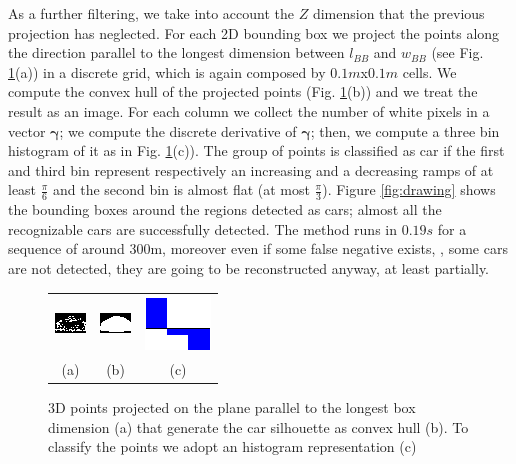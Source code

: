 As a further filtering, we take into account the $Z$ dimension that the previous projection has neglected.
For each 2D bounding box we project the points along the direction parallel to the longest dimension between $l_{BB}$ and $w_{BB}$ (see Fig. \ref{fig:convHull}(a)) in a discrete grid, which is again composed by $0.1m$x$0.1m$ cells.
We compute the convex hull of the projected points (Fig. \ref{fig:convHull}(b)) and we treat the result as an image. 
For each column we collect the number of white pixels in a vector $\mathbf{\gamma}$; we compute the discrete derivative of $\mathbf{\gamma}$; then, we compute a three bin histogram of it as in Fig. \ref{fig:convHull}(c)).
The group of points is classified as car if the first and third bin represent respectively an increasing and a decreasing ramps of at least $\frac{\pi}{6}$ and the second bin is almost flat (at most $\frac{\pi}{3}$). 
Figure \ref{fig:drawing} shows the bounding boxes around the regions detected as cars; almost all the recognizable cars are successfully detected.
The method runs in $0.19s$ for a sequence of around $300$m, moreover even if some false negative exists, \ie, some cars are not detected, they are going to be reconstructed anyway, at least partially.


\begin{figure}[tp]
    \centering
\setlength{\tabcolsep}{1px}
    \begin{tabular}{ccc}
        \includegraphics[width=0.3\columnwidth]{./img/ch-laser/CurProj.png}&
        \includegraphics[width=0.3\columnwidth]{./img/ch-laser/convHull.png}&
        \includegraphics[width=0.3\columnwidth]{./img/ch-laser/hist}\\
        (a)&(b)&(c)
    \end{tabular}
    \caption{3D points projected on the plane parallel to the longest box dimension (a) that generate the car silhouette as convex hull (b). To classify the points we adopt an histogram representation (c)}
    \label{fig:convHull}
\end{figure}

